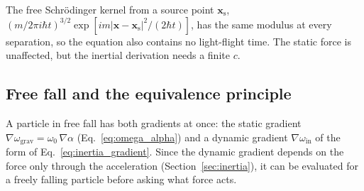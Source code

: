 \documentclass[aps,prd,onecolumn,tightenlines,nofootinbib,notitlepage,11pt,floatfix]{revtex4-2}
\theoremstyle{indentedtheorem}
\begin{document}
The free Schr\"odinger kernel from a source point $\mathbf{x}_\text{s}$, $(m/2\pi i\hbar t)^{3/2}\exp[im|\mathbf{x}-\mathbf{x}_\text{s}|^2/(2\hbar t)]$, has the same modulus at every separation, so the equation also contains no light-flight time. The static force is unaffected, but the inertial derivation needs a finite $c$.

\subsection{Free fall and the equivalence principle}
\label{sec:freefall}

A particle in free fall has both gradients at once: the static gradient $\nabla\omega_\text{grav}=\omega_0 \, \nabla\alpha$ (Eq.~\eqref{eq:omega_alpha}) and a dynamic gradient $\nabla\omega_\text{in}$ of the form of Eq.~\eqref{eq:inertia_gradient}. Since the dynamic gradient depends on the force only through the acceleration (Section~\ref{sec:inertia}), it can be evaluated for a freely falling particle before asking what force acts.
\end{document}
